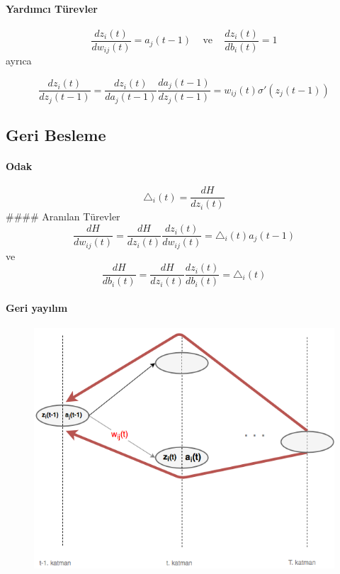 \documentclass[11pt]{article}
\makeatletter
\def\maxwidth{\ifdim\Gin@nat@width>\linewidth\linewidth
    \else\Gin@nat@width\fi}
\let\Oldincludegraphics\includegraphics
\renewcommand{\includegraphics}[1]{\Oldincludegraphics[width=.8\maxwidth]{#1}}
\makeatother
\begin{document}
\paragraph{Yardımcı Türevler}\label{yardux131mcux131-tuxfcrevler}

\[
\frac{dz_i(t)}{ dw_{ij}(t)} = a_j(t-1)
\;\;\;\text{   ve   }\;\;\;
\frac{dz_i(t)}{db_{i}(t)} = 1
\] ayrıca

\[
\frac{dz_i(t)}{dz_j(t-1)} = 
\frac{dz_i(t)}{da_j(t-1)} \frac{da_j(t-1)}{dz_j(t-1)} =  
w_{ij}(t) \sigma'(z_j(t-1)) 
\]

\subsection{Geri Besleme}\label{geri-besleme}

\paragraph{Odak}\label{odak}

\[
\triangle_i(t) =
\frac{dH}{ dz_{i}(t)} 
\] \#\#\#\# Aranılan Türevler \[
\frac{dH}{ dw_{ij}(t)} = 
\frac{dH}{ dz_i(t)}
\frac{dz_i(t)}{ dw_{ij}(t)} =
\triangle_i(t) a_j(t-1)
\] ve \[
\frac{dH}{ db_{i}(t)} 
=\frac{dH}{ dz_i(t)}
\frac{dz_i(t)}{ db_{i}(t)} 
= \triangle_i(t)
\]

\paragraph{Geri yayılım}\label{geri-yayux131lux131m}

\begin{figure}
\centering
\includegraphics{geriyayilim.png}
\caption{}
\end{figure}
\end{document}
